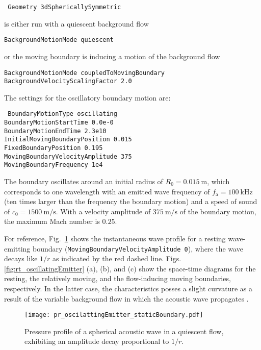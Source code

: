 {\tt
Geometry 3dSphericallySymmetric 
}

is either run with a quiescent background flow 

{\tt BackgroundMotionMode quiescent}

or the moving boundary is inducing a motion of the background flow

{\tt BackgroundMotionMode coupledToMovingBoundary\\
BackgroundVelocityScalingFactor 2.0}

The settings for the oscillatory boundary motion are:

{\tt
BoundaryMotionType oscillating \\
BoundaryMotionStartTime 0.0e-0 \\
BoundaryMotionEndTime 2.3e10 \\
InitialMovingBoundaryPosition 0.015 \\
FixedBoundaryPosition 0.195 \\
MovingBoundaryVelocityAmplitude 375 \\
MovingBoundaryFrequency 1e4
}

The boundary oscillates around an initial radius of $R_0=0.015\:\mathrm{m}$, which corresponds to one wavelength with an emitted wave frequency of $f_{\mathrm{a}}=100\:\mathrm{kHz}$ (ten times larger than the frequency the boundary motion) and a speed of sound of $c_0=1500\:\mathrm{m/s}$. With a velocity amplitude of $375\:\mathrm{m/s}$ of the boundary motion, the maximum Mach number is $0.25$.

For reference, Fig.~\ref{fig:pr_oscilattingEmitter_staticBoundary} shows the instantaneous wave profile for a resting wave-emitting boundary ({\tt MovingBoundaryVelocityAmplitude 0}), where the wave decays like $1/r$ as indicated by the red dashed line. Figs. \ref{fig:rt_oscillatingEmitter} (a), (b), and (c) show the space-time diagrams for the resting, the relatively moving, and the flow-inducing moving boundaries, respectively. In the latter case, the characteristics posses a slight curvature as a result of the variable background flow in which the acoustic wave propagates \citep{Denner2024}.

\begin{figure}[t]
    \centering
    {\texttt{[image: pr\_oscilattingEmitter\_staticBoundary.pdf]}}
    \caption{Pressure profile of a spherical acoustic wave in a quiescent flow, exhibiting an amplitude decay proportional to $1/r$.}
    \label{fig:pr_oscilattingEmitter_staticBoundary}
\end{figure}

